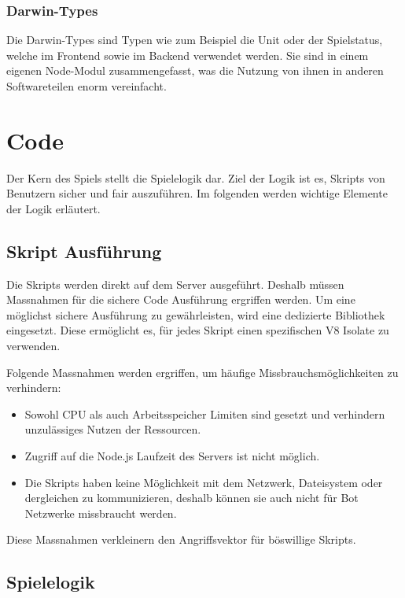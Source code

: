 \documentclass[11pt,a4paper]{scrartcl}
\let\oldsection\section
\renewcommand\section{\clearpage\oldsection}
\begin{document}
\subsubsection{Darwin-Types}
Die Darwin-Types sind Typen wie zum Beispiel die Unit oder der Spielstatus, welche im Frontend sowie im Backend verwendet werden. Sie sind in einem
eigenen Node-Modul zusammengefasst, was die Nutzung von ihnen in anderen Softwareteilen enorm vereinfacht. 

\section{Code}

Der Kern des Spiels stellt die Spielelogik dar. Ziel der Logik ist es, Skripts von Benutzern sicher und fair auszuführen.
Im folgenden werden wichtige Elemente der Logik erläutert.

\subsection{Skript Ausführung}

Die Skripts werden direkt auf dem Server ausgeführt. Deshalb müssen Massnahmen für die sichere Code Ausführung ergriffen werden.
Um eine möglichst sichere Ausführung zu gewährleisten, wird eine dedizierte Bibliothek eingesetzt.
Diese ermöglicht es, für jedes Skript einen spezifischen V8 Isolate zu verwenden.

Folgende Massnahmen werden ergriffen, um häufige Missbrauchsmöglichkeiten zu verhindern:

\begin{itemize}
  \item Sowohl CPU als auch Arbeitsspeicher Limiten sind gesetzt und verhindern unzulässiges Nutzen der Ressourcen.
  \item Zugriff auf die Node.js Laufzeit des Servers ist nicht möglich.
  \item Die Skripts haben keine Möglichkeit mit dem Netzwerk, Dateisystem oder dergleichen zu kommunizieren, deshalb können sie auch nicht für Bot Netzwerke missbraucht werden.
\end{itemize}

Diese Massnahmen verkleinern den Angriffsvektor für böswillige Skripts.

\subsection{Spielelogik}
\end{document}
